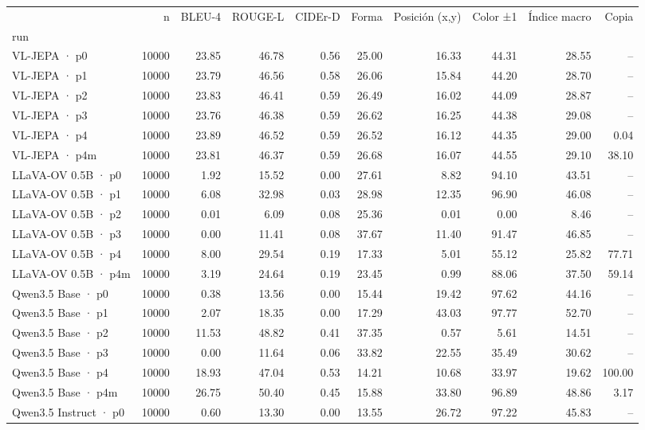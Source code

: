\begin{tabular}{lrrrrrrrrr}
\toprule
 & n & BLEU-4 & ROUGE-L & CIDEr-D & Forma & Posición (x,y) & Color ±1 & Índice macro & Copia \\
run &  &  &  &  &  &  &  &  &  \\
\midrule
VL-JEPA · p0 & 10000 & 23.85 & 46.78 & 0.56 & 25.00 & 16.33 & 44.31 & 28.55 & -- \\
VL-JEPA · p1 & 10000 & 23.79 & 46.56 & 0.58 & 26.06 & 15.84 & 44.20 & 28.70 & -- \\
VL-JEPA · p2 & 10000 & 23.83 & 46.41 & 0.59 & 26.49 & 16.02 & 44.09 & 28.87 & -- \\
VL-JEPA · p3 & 10000 & 23.76 & 46.38 & 0.59 & 26.62 & 16.25 & 44.38 & 29.08 & -- \\
VL-JEPA · p4 & 10000 & 23.89 & 46.52 & 0.59 & 26.52 & 16.12 & 44.35 & 29.00 & 0.04 \\
VL-JEPA · p4m & 10000 & 23.81 & 46.37 & 0.59 & 26.68 & 16.07 & 44.55 & 29.10 & 38.10 \\
LLaVA-OV 0.5B · p0 & 10000 & 1.92 & 15.52 & 0.00 & 27.61 & 8.82 & 94.10 & 43.51 & -- \\
LLaVA-OV 0.5B · p1 & 10000 & 6.08 & 32.98 & 0.03 & 28.98 & 12.35 & 96.90 & 46.08 & -- \\
LLaVA-OV 0.5B · p2 & 10000 & 0.01 & 6.09 & 0.08 & 25.36 & 0.01 & 0.00 & 8.46 & -- \\
LLaVA-OV 0.5B · p3 & 10000 & 0.00 & 11.41 & 0.08 & 37.67 & 11.40 & 91.47 & 46.85 & -- \\
LLaVA-OV 0.5B · p4 & 10000 & 8.00 & 29.54 & 0.19 & 17.33 & 5.01 & 55.12 & 25.82 & 77.71 \\
LLaVA-OV 0.5B · p4m & 10000 & 3.19 & 24.64 & 0.19 & 23.45 & 0.99 & 88.06 & 37.50 & 59.14 \\
Qwen3.5 Base · p0 & 10000 & 0.38 & 13.56 & 0.00 & 15.44 & 19.42 & 97.62 & 44.16 & -- \\
Qwen3.5 Base · p1 & 10000 & 2.07 & 18.35 & 0.00 & 17.29 & 43.03 & 97.77 & 52.70 & -- \\
Qwen3.5 Base · p2 & 10000 & 11.53 & 48.82 & 0.41 & 37.35 & 0.57 & 5.61 & 14.51 & -- \\
Qwen3.5 Base · p3 & 10000 & 0.00 & 11.64 & 0.06 & 33.82 & 22.55 & 35.49 & 30.62 & -- \\
Qwen3.5 Base · p4 & 10000 & 18.93 & 47.04 & 0.53 & 14.21 & 10.68 & 33.97 & 19.62 & 100.00 \\
Qwen3.5 Base · p4m & 10000 & 26.75 & 50.40 & 0.45 & 15.88 & 33.80 & 96.89 & 48.86 & 3.17 \\
Qwen3.5 Instruct · p0 & 10000 & 0.60 & 13.30 & 0.00 & 13.55 & 26.72 & 97.22 & 45.83 & -- \\

\end{tabular}
